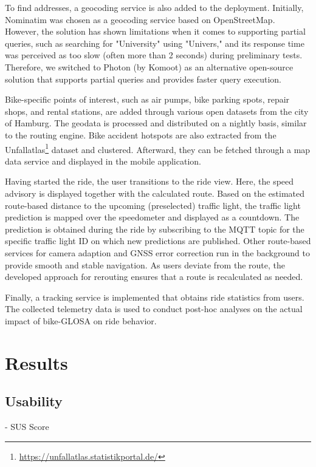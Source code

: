 To find addresses, a geocoding service is also added to the deployment. Initially, Nominatim was chosen as a geocoding service based on OpenStreetMap. However, the solution has shown limitations when it comes to supporting partial queries, such as searching for "University" using "Univers," and its response time was perceived as too slow (often more than 2 seconds) during preliminary tests. Therefore, we switched to Photon (by Komoot) as an alternative open-source solution that supports partial queries and provides faster query execution.

Bike-specific points of interest, such as air pumps, bike parking spots, repair shops, and rental stations, are added through various open datasets from the city of Hamburg. The geodata is processed and distributed on a nightly basis, similar to the routing engine. Bike accident hotspots are also extracted from the Unfallatlas\footnote{\url{https://unfallatlas.statistikportal.de/}} dataset and clustered. Afterward, they can be fetched through a map data service and displayed in the mobile application.

Having started the ride, the user transitions to the ride view. Here, the speed advisory is displayed together with the calculated route. Based on the estimated route-based distance to the upcoming (preselected) traffic light, the traffic light prediction is mapped over the speedometer and displayed as a countdown. The prediction is obtained during the ride by subscribing to the MQTT topic for the specific traffic light ID on which new predictions are published. Other route-based services for camera adaption and GNSS error correction run in the background to provide smooth and stable navigation. As users deviate from the route, the developed approach for rerouting ensures that a route is recalculated as needed.

Finally, a tracking service is implemented that obtains ride statistics from users. The collected telemetry data is used to conduct post-hoc analyses on the actual impact of bike-GLOSA on ride behavior.

\section{Results}

\subsection{Usability}

- SUS Score

